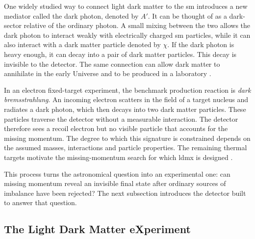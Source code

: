 One widely studied way to connect light dark matter to the \gls{sm} introduces
a new mediator called the \gls{dark photon}, denoted by \(A'\). It can be
thought of as a dark-sector relative of the ordinary photon. A small mixing
between the two allows the dark photon to interact weakly with electrically
charged \gls{sm} particles, while it can also interact with a dark matter
particle denoted by \(\chi\). If the dark photon is heavy enough, it can decay
into a pair of dark matter particles. This decay is invisible to the detector.
The same connection can allow dark matter to annihilate in the early Universe
and to be produced in a laboratory
\cite{cirelli2026-darkmatter,ldmx2025-overview}.

In an electron fixed-target experiment, the benchmark production reaction is
\emph{dark bremsstrahlung}. An incoming electron scatters in the field of a
target nucleus and radiates a dark photon, which then decays into two dark
matter particles. These particles traverse the detector without a measurable
interaction. The detector therefore sees a recoil electron but no visible
particle that accounts for the missing momentum. The degree to which this
signature is constrained depends on the assumed masses, interactions and
particle properties. The remaining thermal targets motivate the
missing-momentum search for which \gls{ldmx} is designed
\cite{akesson2018-ldmx,ldmx2025-overview}.


This process turns the astronomical question into an experimental one: can
missing momentum reveal an invisible final state after ordinary sources of
imbalance have been rejected? The next subsection introduces the detector built
to answer that question.

\subsection{The Light Dark Matter eXperiment}
\label{sec:ldmx}

